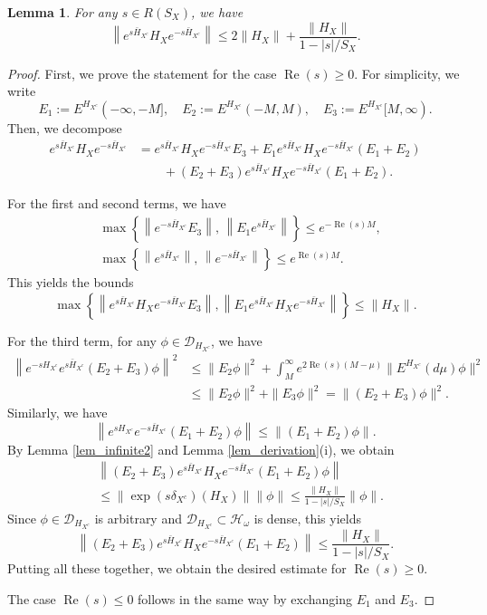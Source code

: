 \documentclass[11pt]{article}
\numberwithin{equation}{section}
\newtheorem{lemma}[theorem]{Lemma}
\begin{document}
\begin{lemma}\label{lem_G1}
For any $s\in R(S_X)$, we have
\[
\left\|
e^{s\bar{H}_{X^c}}H_X e^{-s\bar{H}_{X^c}}
\right\|
\leq 2\|H_X\| +\frac{\|H_X\|}{1-|s|/S_X}.
\]
\end{lemma}
\begin{proof}
First, we prove the statement for the case $\operatorname{Re}(s)\geq0$. For simplicity, we write
\[
E_1:=E^{H_{X^c}}(-\infty,-M],\quad
E_2:=E^{H_{X^c}}(-M,M),\quad
E_3:=E^{H_{X^c}}[M,\infty).
\]
Then, we decompose
\begin{align*}
e^{s\bar{H}_{X^c}}H_X e^{-s\bar{H}_{X^c}}
&= e^{s\bar{H}_{X^c}} H_X e^{-s\bar{H}_{X^c}}E_3
+ E_1 e^{s\bar{H}_{X^c}} H_X e^{-s\bar{H}_{X^c}}(E_1+E_2)\\
&\qquad+(E_2+E_3) e^{s\bar{H}_{X^c}} H_X e^{-s\bar{H}_{X^c}}(E_1+E_2).
\end{align*}

For the first and second terms, we have
\begin{align*}
&\max\left\{ \left\|e^{-s\bar{H}_{X^c}} E_3\right\|,\,
\left\|E_1 e^{s\bar{H}_{X^c}}\right\| \right\}\leq e^{-\operatorname{Re}(s) M},\\
&\max\left\{\left\| e^{s\bar{H}_{X^c}}\right\|,\,
\left\|e^{-s\bar{H}_{X^c}}\right\|\right\} \leq e^{\operatorname{Re}(s) M}. 
\end{align*}
This yields the bounds
\[
\max\left\{
\left\|
e^{s\bar{H}_{X^c}} H_X e^{-s\bar{H}_{X^c}} E_3
\right\|,
\left\|
E_1 e^{s\bar{H}_{X^c}} H_X e^{-s\bar{H}_{X^c}}
\right\|
\right\}
\leq \|H_X\|.
\]

For the third term, for any $\phi\in\mathcal{D}_{H_{X^c}}$, we have
\begin{align*}
\left\|
e^{-sH_{X^c}}e^{s\bar{H}_{X^c}}
(E_2+E_3)\phi
\right\|^2
&\leq \|E_2\phi\|^2+
\int_M^\infty e^{2\operatorname{Re}(s)(M-\mu)} \|E^{H_{X^c}}(d\mu)\phi\|^2\\
&\leq \|E_2\phi\|^2+ \|E_3\phi\|^2
=\|(E_2+E_3)\phi\|^2.
\end{align*}
Similarly, we have
\[
\left\|
e^{sH_{X^c}}e^{-s\bar{H}_{X^c}}(E_1+E_2)\phi
\right\|
\leq \|(E_1+E_2)\phi\|.
\]
By Lemma \ref{lem_infinite2} and Lemma \ref{lem_derivation}(i), we obtain
\begin{align*}
&\left\|
(E_2+E_3) e^{s\bar{H}_{X^c}} H_X e^{-s\bar{H}_{X^c}} (E_1+E_2)\phi
\right\|\\
&\leq \|\exp(s\delta_{X^c})(H_X)\| \|\phi\|
\leq \frac{\|H_X\|}{1-|s|/S_X} \|\phi\|.
\end{align*}
Since $\phi\in\mathcal{D}_{H_{X^c}}$ is arbitrary and $\mathcal{D}_{H_{X^c}}\subset\mathcal{H}_\omega$ is dense, this yields
\[
\left\|
(E_2+E_3) e^{s\bar{H}_{X^c}} H_X e^{-s\bar{H}_{X^c}} (E_1+E_2)
\right\|
\leq \frac{\|H_X\|}{1-|s|/S_X}.
\]
Putting all these together, we obtain the desired estimate for $\operatorname{Re}(s)\geq0$. 

The case $\operatorname{Re}(s)\leq0$ follows in the same way by exchanging $E_1$ and $E_3$. 
\end{proof}
\end{document}
